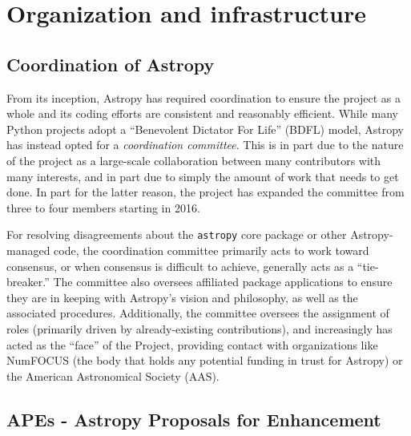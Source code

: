 \documentclass[modern]{aastex61}
\newcommand{\package}[1]{\texttt{#1}\xspace}
\newcommand{\astropy}{Astropy\xspace}
\newcommand{\astropypkg}{\package{astropy}}
\begin{document}
\section{Organization and infrastructure}
\label{sec:org}

\subsection{Coordination of Astropy}

From its inception, \astropy has required coordination to ensure the project as a whole and its coding efforts are consistent and reasonably efficient.
While many Python projects adopt a ``Benevolent Dictator For Life'' (BDFL) model, \astropy has instead opted for a \emph{coordination committee}.
This is in part due to the nature of the project as a large-scale collaboration between many contributors with many interests, and in part due to simply the amount of work that needs to get done.
In part for the latter reason, the project has expanded the committee from three to four members starting in 2016.

For resolving disagreements about the \astropypkg core package or other \astropy-managed code, the coordination committee primarily acts to work toward consensus, or when consensus is difficult to achieve, generally acts as a ``tie-breaker.''
The committee also oversees affiliated package applications to ensure they are in keeping with \astropy's vision and philosophy, as well as the associated procedures.
Additionally, the committee oversees the assignment of roles (primarily driven by already-existing contributions), and increasingly has acted as the ``face'' of the Project, providing contact with organizations like NumFOCUS (the body that holds any potential funding in trust for \astropy) or the American Astronomical Society (AAS).


\subsection{APEs - Astropy Proposals for Enhancement}
\end{document}
